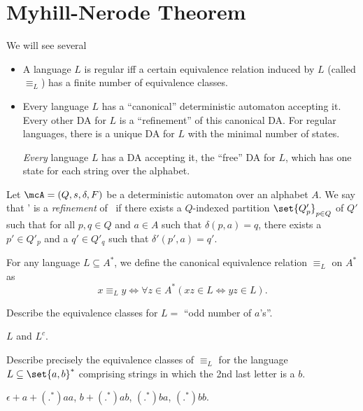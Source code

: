 \section{Myhill-Nerode Theorem} \label{sec:mn}
We will see several %
\begin{itemize}
    \item A language $L$ is regular iff a certain equivalence relation
    induced by $L$ (called $\equiv_L$) has a finite number of equivalence
    classes.
    \item Every language $L$ has a ``canonical'' deterministic automaton
    accepting it.
    Every other DA for $L$ is a ``refinement'' of this canonical DA.
    For regular languages, there is a unique DA for $L$ with the minimal
    number of states.
    \begin{remark}
        \emph{Every} language $L$ has a DA accepting it, the ``free'' DA for
        $L$, which has one state for each string over the alphabet.
    \end{remark}
\end{itemize}

\begin{definition}[Refinement] \label{def:mn:refinement}
    Let $\mcA = (Q, s, \delta, F)$ be a deterministic automaton over an
    alphabet $A$.
    We say that \mcA' is a \emph{refinement} of \mcA\ if there exists a
    $Q$-indexed partition $\set{Q'_p}_{p \in Q}$ of $Q'$ such that for all
    $p, q \in Q$ and $a \in A$ such that $\delta(p, a) = q$, there exists a
    $p' \in Q'_p$ and a $q' \in Q'_q$ such that $\delta'(p', a) = q'$.
\end{definition}

\begin{definition}
    For any language $L \subseteq A^*$, we define the canonical equivalence
    relation $\equiv_L$ on $A^*$ as \[
        x \equiv_L y \iff \forall z \in A^*(xz \in L \iff yz \in L).
    \]
\end{definition}

\begin{exercise}
    Describe the equivalence classes for $L = $ ``odd number of $a$'s''.
\end{exercise}
\begin{solution}
    $L$ and $L^c$.
\end{solution}

\begin{exercise}
    Describe precisely the equivalence classes of $\equiv_L$ for the
    language $L \subseteq \set{a, b}^*$ comprising strings in which the 2nd
    last letter is a $b$.
\end{exercise}
\begin{solution}
    $\epsilon + a + (.^*)aa$, $b + (.^*)ab$, $(.^*)ba$,
    $(.^*)bb$.
\end{solution}

